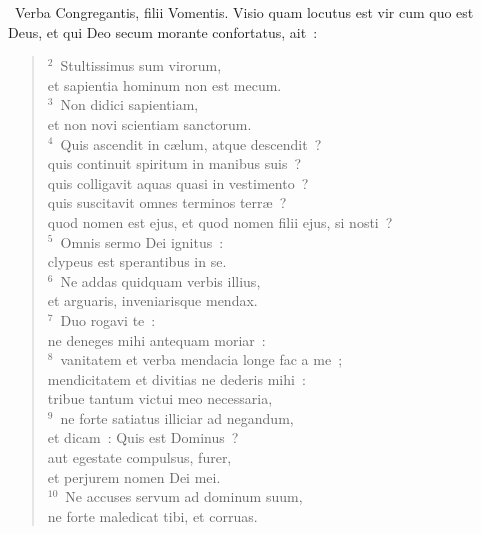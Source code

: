 ~Verba Congregantis, filii Vomentis. Visio quam locutus est vir cum quo est Deus, et qui Deo secum morante confortatus, ait~:
\begin{flushleft}\begin{verse}\vspace{6pt}${}^{2}$~Stultissimus sum virorum,\\ et sapientia hominum non est mecum.\\
${}^{3}$~Non didici sapientiam,\\ et non novi scientiam sanctorum.\\
${}^{4}$~Quis ascendit in c\ae lum, atque descendit~?\\ quis continuit spiritum in manibus suis~?\\ quis colligavit aquas quasi in vestimento~?\\ quis suscitavit omnes terminos terr\ae~?\\ quod nomen est ejus, et quod nomen filii ejus, si nosti~?\\
${}^{5}$~Omnis sermo Dei ignitus~:\\ clypeus est sperantibus in se.\\
${}^{6}$~Ne addas quidquam verbis illius,\\ et arguaris, inveniarisque mendax.\\
${}^{7}$~Duo rogavi te~:\\ ne deneges mihi antequam moriar~:\\
${}^{8}$~vanitatem et verba mendacia longe fac a me~;\\ mendicitatem et divitias ne dederis mihi~:\\ tribue tantum victui meo necessaria,\\
${}^{9}$~ne forte satiatus illiciar ad negandum,\\ et dicam~: Quis est Dominus~?\\ aut egestate compulsus, furer,\\ et perjurem nomen Dei mei.\\
${}^{10}$~Ne accuses servum ad dominum suum,\\ ne forte maledicat tibi, et corruas.\end{verse}\end{flushleft}


